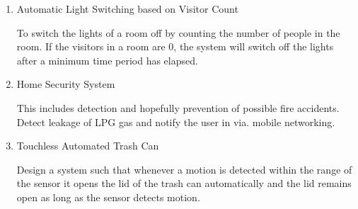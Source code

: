 \begin{enumerate}

  \item Automatic Light Switching based on Visitor Count

    To switch the lights of a room off by counting the number of
    people in the room. If the visitors in a room are 0, the system
    will switch off the lights after a minimum time period has
    elapsed.

  \item Home Security System

    This includes detection and hopefully prevention of possible fire
    accidents. Detect leakage of LPG gas and notify the user in via.
    mobile networking.


  \item Touchless Automated Trash Can

    Design a system such that whenever a motion is detected within the
    range of the sensor it opens the lid of the trash can
    automatically and the lid remains open as long as the sensor
    detects motion.


\end{enumerate}
